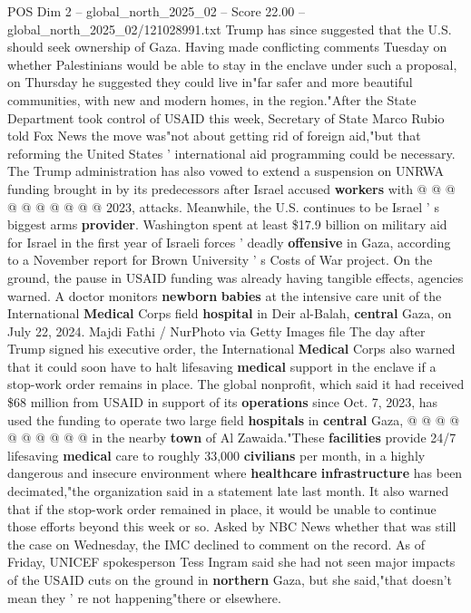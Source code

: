 \begin{textsample}{POS Dim 2 – global\_north\_2025\_02 – Score 22.00 – global\_north\_2025\_02/121028991.txt}
Trump has since suggested that the U.S. should seek ownership of Gaza.
Having made conflicting comments Tuesday on whether Palestinians would be able to stay in the enclave under such a proposal, on Thursday he suggested they could live in"far safer and more beautiful communities, with new and modern homes, in the region."After the State Department took control of USAID this week, Secretary of State Marco Rubio told Fox News the move was"not about getting rid of foreign aid,"but that reforming the United States ' international aid programming could be necessary.
The Trump administration has also vowed to extend a suspension on UNRWA funding brought in by its predecessors after Israel accused \textbf{workers} with @ @ @ @ @ @ @ @ @ @ 2023, attacks.
Meanwhile, the U.S. continues to be Israel ' s biggest arms \textbf{provider}.
Washington spent at least \$17.9 billion on military aid for Israel in the first year of Israeli forces ' deadly \textbf{offensive} in Gaza, according to a November report for Brown University ' s Costs of War project.
On the ground, the pause in USAID funding was already having tangible effects, agencies warned.
A doctor monitors \textbf{newborn} \textbf{babies} at the intensive care unit of the International \textbf{Medical} Corps field \textbf{hospital} in Deir al-Balah, \textbf{central} Gaza, on July 22, 2024.
Majdi Fathi / NurPhoto via Getty Images file The day after Trump signed his executive order, the International \textbf{Medical} Corps also warned that it could soon have to halt lifesaving \textbf{medical} support in the enclave if a stop-work order remains in place.
The global nonprofit, which said it had received \$68 million from USAID in support of its \textbf{operations} since Oct. 7, 2023, has used the funding to operate two large field \textbf{hospitals} in \textbf{central} Gaza, @ @ @ @ @ @ @ @ @ @ in the nearby \textbf{town} of Al Zawaida."These \textbf{facilities} provide 24/7 lifesaving \textbf{medical} care to roughly 33,000 \textbf{civilians} per month, in a highly dangerous and insecure environment where \textbf{healthcare} \textbf{infrastructure} has been decimated,"the organization said in a statement late last month.
It also warned that if the stop-work order remained in place, it would be unable to continue those efforts beyond this week or so.
Asked by NBC News whether that was still the case on Wednesday, the IMC declined to comment on the record.
As of Friday, UNICEF spokesperson Tess Ingram said she had not seen major impacts of the USAID cuts on the ground in \textbf{northern} Gaza, but she said,"that doesn't mean they ' re not happening"there or elsewhere.

\end{textsample}
